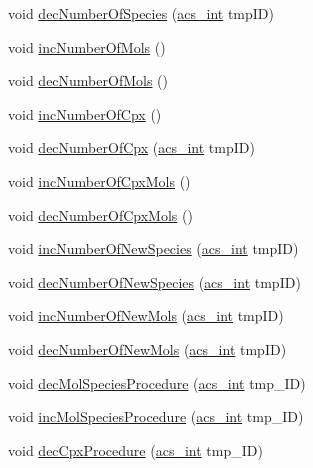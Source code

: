 \begin{DoxyCompactItemize}
\item 
void \hyperlink{a00003_a69a926e0b9bb4f4b29876d0e45b54d84}{dec\-Number\-Of\-Species} (\hyperlink{a00016_a8d277355641a098190360234e2ebde35}{acs\-\_\-int} tmp\-I\-D)
\item 
void \hyperlink{a00003_ae356db3b6ee374b998e9f041216b4b75}{inc\-Number\-Of\-Mols} ()
\item 
void \hyperlink{a00003_af042f7904c92fdd239995bebbab2cf60}{dec\-Number\-Of\-Mols} ()
\item 
void \hyperlink{a00003_a69ae530ef6f9298e3ab8304157709404}{inc\-Number\-Of\-Cpx} ()
\item 
void \hyperlink{a00003_aadd057e7038269e6fac314a12a3bf334}{dec\-Number\-Of\-Cpx} (\hyperlink{a00016_a8d277355641a098190360234e2ebde35}{acs\-\_\-int} tmp\-I\-D)
\item 
void \hyperlink{a00003_ab101d2158575829ddfe846087040f2fa}{inc\-Number\-Of\-Cpx\-Mols} ()
\item 
void \hyperlink{a00003_a756dc43b6b47498ba457613749324b15}{dec\-Number\-Of\-Cpx\-Mols} ()
\item 
void \hyperlink{a00003_a1055886a34a9a01ec37db31c69e460e0}{inc\-Number\-Of\-New\-Species} (\hyperlink{a00016_a8d277355641a098190360234e2ebde35}{acs\-\_\-int} tmp\-I\-D)
\item 
void \hyperlink{a00003_a5fa52a4f8e73a71fa41d3a1641e50535}{dec\-Number\-Of\-New\-Species} (\hyperlink{a00016_a8d277355641a098190360234e2ebde35}{acs\-\_\-int} tmp\-I\-D)
\item 
void \hyperlink{a00003_a1addb84f0c8d391f97ad2347a64208bb}{inc\-Number\-Of\-New\-Mols} (\hyperlink{a00016_a8d277355641a098190360234e2ebde35}{acs\-\_\-int} tmp\-I\-D)
\item 
void \hyperlink{a00003_ae9bbd78076706050ced4dd7fb99036f1}{dec\-Number\-Of\-New\-Mols} (\hyperlink{a00016_a8d277355641a098190360234e2ebde35}{acs\-\_\-int} tmp\-I\-D)
\item 
void \hyperlink{a00003_a10fad450cf5ef3a1c7cf75d616105069}{dec\-Mol\-Species\-Procedure} (\hyperlink{a00016_a8d277355641a098190360234e2ebde35}{acs\-\_\-int} tmp\-\_\-\-I\-D)
\item 
void \hyperlink{a00003_a7e0e11e36d7bcd6ef438c426aa8754a0}{inc\-Mol\-Species\-Procedure} (\hyperlink{a00016_a8d277355641a098190360234e2ebde35}{acs\-\_\-int} tmp\-\_\-\-I\-D)
\item 
void \hyperlink{a00003_a16d09f818d3012f88e8e4c9a7759b6bd}{dec\-Cpx\-Procedure} (\hyperlink{a00016_a8d277355641a098190360234e2ebde35}{acs\-\_\-int} tmp\-\_\-\-I\-D)
\item 

\end{DoxyCompactItemize}
